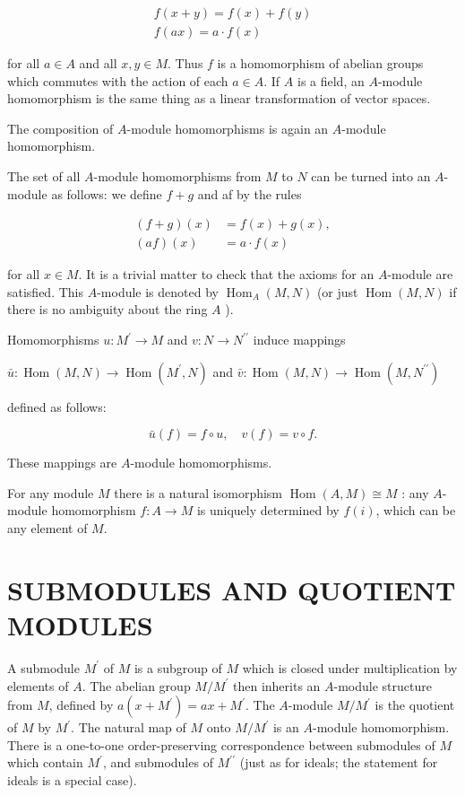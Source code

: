 \documentclass{standalone}
\theoremstyle{definition}
\theoremstyle{remark}
\begin{document}
\[
\begin{gathered}
f(x+y)=f(x)+f(y) \\
f(a x)=a \cdot f(x)
\end{gathered}
\]

for all $a \in A$ and all $x, y \in M$. Thus $f$ is a homomorphism of abelian groups which commutes with the action of each $a \in A$. If $A$ is a field, an $A$-module homomorphism is the same thing as a linear transformation of vector spaces.

The composition of $A$-module homomorphisms is again an $A$-module homomorphism.

The set of all $A$-module homomorphisms from $M$ to $N$ can be turned into an $A$-module as follows: we define $f+g$ and af by the rules

\[
\begin{aligned}
(f+g)(x) & =f(x)+g(x), \\
(a f)(x) & =a \cdot f(x)
\end{aligned}
\]

for all $x \in M$. It is a trivial matter to check that the axioms for an $A$-module are satisfied. This $A$-module is denoted by $\operatorname{Hom}_{A}(M, N)$ (or just $\operatorname{Hom}(M, N)$ if there is no ambiguity about the ring $A$ ).

Homomorphisms $u: M^{\prime} \rightarrow M$ and $v: N \rightarrow N^{\prime \prime}$ induce mappings

$\bar{u}: \operatorname{Hom}(M, N) \rightarrow \operatorname{Hom}\left(M^{\prime}, N\right)$ and $\bar{v}: \operatorname{Hom}(M, N) \rightarrow \operatorname{Hom}\left(M, N^{\prime \prime}\right)$

defined as follows:

\[
\bar{u}(f)=f \circ u, \quad v(f)=v \circ f .
\]

These mappings are $A$-module homomorphisms.

For any module $M$ there is a natural isomorphism $\operatorname{Hom}(A, M) \cong M$ : any $A$-module homomorphism $f: A \rightarrow M$ is uniquely determined by $f(i)$, which can be any element of $M$.

\section{SUBMODULES AND QUOTIENT MODULES}
A submodule $M^{\prime}$ of $M$ is a subgroup of $M$ which is closed under multiplication by elements of $A$. The abelian group $M / M^{\prime}$ then inherits an $A$-module structure from $M$, defined by $a\left(x+M^{\prime}\right)=a x+M^{\prime}$. The $A$-module $M / M^{\prime}$ is the quotient of $M$ by $M^{\prime}$. The natural map of $M$ onto $M / M^{\prime}$ is an $A$-module homomorphism. There is a one-to-one order-preserving correspondence between submodules of $M$ which contain $M^{\prime}$, and submodules of $M^{\prime \prime}$ (just as for ideals; the statement for ideals is a special case).
\end{document}
